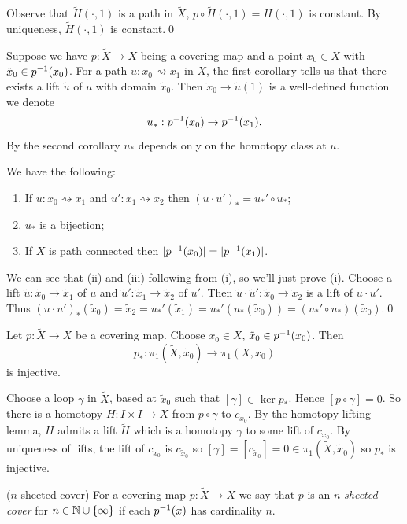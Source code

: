 \documentclass{article}
\begin{document}
Observe that $ \tilde H(\cdot, 1) $ is a path in $ \tilde X $, $ p\circ\tilde H(\cdot, 1) = H(\cdot,1) $ is constant. By uniqueness, $ \tilde H(\cdot, 1) $ is constant.\qed
\par
Suppose we have $ p:\tilde X \to X $ being a covering map and a point $ x_0\in X $ with $ \tilde x_0\in {p}^{-1}(x_0) $. For a path $ u: x_0\rightsquigarrow x_1 $ in $ X $, the first corollary tells us that there exists a lift $ \tilde u $ of $ u $ with domain $ \tilde x_0 $. Then $ \tilde x_0 \to \tilde u(1) $ is a well-defined function we denote
\[
  u_*: {p}^{-1}(x_0) \to {p}^{-1}(x_1).
\]
By the second corollary $ u_* $ depends only on the homotopy class at $ u $.
\begin{corollary}
	We have the following:
	\begin{enumerate}
		\item If $ u:x_0\rightsquigarrow x_1 $ and $ u':x_1\rightsquigarrow x_2 $ then $ (u\cdot u')_* = u_*' \circ u_* $;
		\item $ u_* $ is a bijection;
		\item If $ X $ is path connected then $ |{p}^{-1}(x_0)| = |{p}^{-1}(x_1)| $.
	\end{enumerate}
\end{corollary}
\pf We can see that (ii) and (iii) following from (i), so we'll just prove (i). Choose a lift $ \tilde u:\tilde x_0\to \tilde x_1 $ of $ u $ and $ \tilde u': \tilde x_1 \to \tilde x_2 $ of $ u' $. Then $ \tilde u \cdot \tilde u' : \tilde x_0\to\tilde x_2 $ is a lift of $ u\cdot u' $. Thus $ (u\cdot u')_*(\tilde x_0) = \tilde x_2 = u_*'(\tilde x_1) = u_*'(u_*(\tilde x_0)) = (u_*'\circ u_*)(\tilde x_0) $.\qed
\begin{lemma}
  Let $ p:\tilde X\to X $ be a covering map. Choose $ x_0\in X $, $ \tilde x_0\in {p}^{-1}(x_0) $. Then
  \[
    p_*: \pi_1(\tilde X,\tilde x_0) \to \pi_1(X,x_0)
  \]
  is injective.
\end{lemma}
\pf Choose a loop $ \gamma $ in $ \tilde X $, based at $ \tilde x_0 $ such that $ [\gamma]\in\ker p_* $. Hence $ [p\circ \gamma] = 0 $. So there is a homotopy $ H: I\times I\to X $ from $ p\circ\gamma $ to $ c_{x_0} $. By the homotopy lifting lemma, $ H $ admits a lift $ \tilde H $ which is a homotopy $ \gamma $ to some lift of $ c_{x_0} $. By uniqueness of lifts, the lift of $ c_{x_0} $ is $ c_{\tilde x_0} $ so $ [\gamma] = [c_{\tilde x_0}] = 0\in \pi_1(\tilde X,\tilde x_0) $ so $ p_* $ is injective.
\begin{definition}
	($ n $-sheeted cover) For a covering map $ p:\tilde X\to X $ we say that $ p $ is an $ n $-\textit{sheeted cover} for $ n\in \mathbb{N}\cup \{\infty\} $ if each $ {p}^{-1}(x) $ has cardinality $ n $.
\end{definition}
\end{document}

